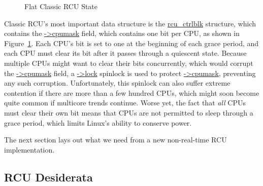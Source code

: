 \begin{figure}[htb]
\begin{center}
\end{center}
\caption{Flat Classic RCU State}
\label{fig:app:rcuimpl:rcutree:Flat Classic RCU State}
\end{figure}

Classic RCU's most important data structure is the \url{rcu_ctrlblk}
structure, which contains the \url{->cpumask} field, which contains
one bit per CPU, as shown in
Figure~\ref{fig:app:rcuimpl:rcutree:Flat Classic RCU State}.
Each CPU's bit is set to one at the beginning of each grace period,
and each CPU must clear its bit after it passes through a quiescent
state.
Because multiple CPUs might want to clear their bits concurrently,
which would corrupt the \url{->cpumask} field, a
\url{->lock} 
spinlock is used to protect \url{->cpumask}, preventing any
such corruption.
Unfortunately, this spinlock can also suffer extreme contention if there
are more than a few hundred CPUs, which might soon become quite common
if multicore trends continue.
Worse yet, the fact that \emph{all} CPUs must clear their own bit means
that CPUs are not permitted to sleep through a grace period, which limits
Linux's ability to conserve power.




The next section lays out what we need from a new non-real-time
RCU implementation.

\subsection{RCU Desiderata}
\label{app:rcuimpl:rcutree:RCU Desiderata}

